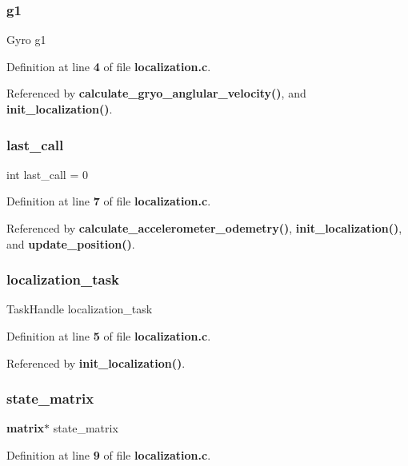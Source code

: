 \subsubsection{g1}
{\footnotesize\ttfamily Gyro g1\hspace{0.3cm}{\ttfamily [static]}}



Definition at line \textbf{ 4} of file \textbf{ localization.\+c}.



Referenced by \textbf{ calculate\+\_\+gryo\+\_\+anglular\+\_\+velocity()}, and \textbf{ init\+\_\+localization()}.

\mbox{\label{localization_8c_a0f327d31da83831114e7417abb7b6b63}} 
\subsubsection{last\+\_\+call}
{\footnotesize\ttfamily int last\+\_\+call = 0\hspace{0.3cm}{\ttfamily [static]}}



Definition at line \textbf{ 7} of file \textbf{ localization.\+c}.



Referenced by \textbf{ calculate\+\_\+accelerometer\+\_\+odemetry()}, \textbf{ init\+\_\+localization()}, and \textbf{ update\+\_\+position()}.

\mbox{\label{localization_8c_a5be50f74f0f5a3aea13f2bd8db891488}} 
\subsubsection{localization\+\_\+task}
{\footnotesize\ttfamily Task\+Handle localization\+\_\+task\hspace{0.3cm}{\ttfamily [static]}}



Definition at line \textbf{ 5} of file \textbf{ localization.\+c}.



Referenced by \textbf{ init\+\_\+localization()}.

\mbox{\label{localization_8c_a424e677cc0238390cb4a3068a6f3518c}} 
\subsubsection{state\+\_\+matrix}
{\footnotesize\ttfamily \textbf{ matrix}$\ast$ state\+\_\+matrix}



Definition at line \textbf{ 9} of file \textbf{ localization.\+c}.

